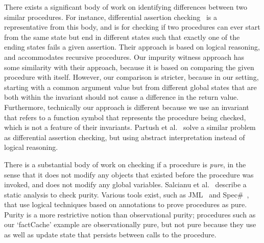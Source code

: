 There exists a significant body of work on identifying differences between
two similar procedures.  For instance, differential assertion
checking~\cite{lahiri2013differential} is a representative from this body,
and is for checking if two procedures can ever start from the same state
but end in different states such that exactly one of the ending states
fails a given assertion. Their
approach is based on logical reasoning, and accommodates recursive
procedures. Our impurity witness approach has some similarity with their
approach, because it is based on comparing the given procedure with
itself. However, our comparison is stricter, because in our setting,
starting with a common argument value but from different global states that
are both within the invariant should not cause a difference in the return
value. Furthermore, technically our approach is different because we use an
invariant that refers to a function symbol that represents the procedure
being checked, which is not a feature of their invariants. Partush et
al.~\cite{partush2013abstract} solve a similar problem as differential
assertion checking, but using abstract interpretation instead of logical
reasoning.

There is a substantial body of work on checking if a procedure is
\emph{pure}, in the sense that it does not
modify any objects that existed before the procedure was invoked, and does not
modify any  global variables. Salcianu et
al.~\cite{sualcianu2005purity} describe a static analysis to check purity.
Various tools exist, such as
JML~\cite{leavens2008jml} and Spec\#~\cite{barnett2004spec}, that use logical
techniques based on annotations to prove procedures as pure.  Purity is a
more restrictive notion than observational purity; procedures such
as our `factCache' example are observationally pure, but not pure because
they use as well as update state that persists between calls to the
procedure. 
